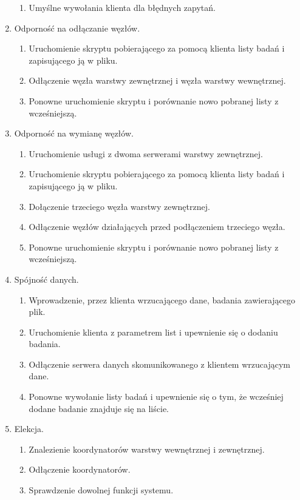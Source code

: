 \begin{enumerate}
\begin{enumerate}[label*=\arabic*.]
		\item Umyślne wywołania klienta dla błędnych zapytań. 
	\end{enumerate}
	\item Odporność na odłączanie węzłów.
	\begin{enumerate}[label*=\arabic*.]
		\item Uruchomienie skryptu pobierającego za pomocą klienta listy badań i zapisującego ją w pliku. 
		\item Odłączenie węzła warstwy zewnętrznej i węzła warstwy wewnętrznej.
		\item Ponowne uruchomienie skryptu i porównanie nowo pobranej listy z wcześniejszą.
	\end{enumerate}
	\item Odporność na wymianę węzłów.
	\begin{enumerate}[label*=\arabic*.]
		\item Uruchomienie usługi z dwoma serwerami warstwy zewnętrznej. 
		\item Uruchomienie skryptu pobierającego za pomocą klienta listy badań i zapisującego ją w pliku.
		\item Dołączenie trzeciego węzła warstwy zewnętrznej.
		\item Odłączenie węzłów działających przed podłączeniem trzeciego węzła.
		\item Ponowne uruchomienie skryptu i porównanie nowo pobranej listy z wcześniejszą.
	\end{enumerate}
	\item Spójność danych.
	\begin{enumerate}[label*=\arabic*.]
		\item Wprowadzenie, przez klienta wrzucającego dane, badania zawierającego plik. 
		\item Uruchomienie klienta z parametrem list i upewnienie się o dodaniu badania.
		\item Odłączenie serwera danych skomunikowanego z klientem wrzucającym dane.
		\item Ponowne wywołanie listy badań i upewnienie się o tym, że wcześniej dodane badanie znajduje się na liście.
	\end{enumerate}
	\item Elekcja.
	\begin{enumerate}[label*=\arabic*.]
		\item Znalezienie koordynatorów warstwy wewnętrznej i zewnętrznej.
		\item Odłączenie koordynatorów. 
		\item Sprawdzenie dowolnej funkcji systemu.  

\end{enumerate}
\end{enumerate}
